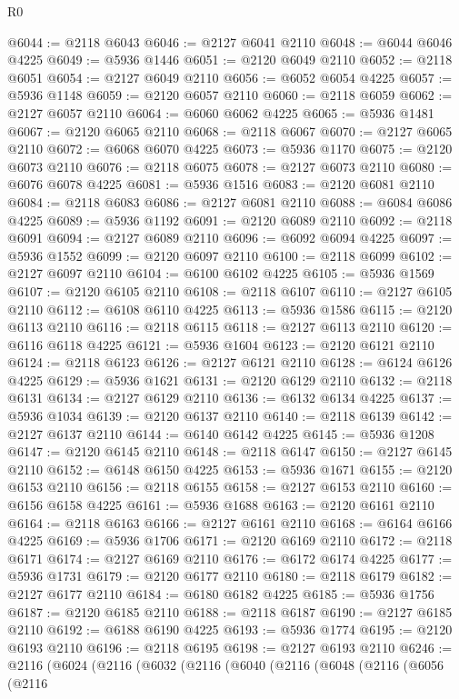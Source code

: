 \begin{lexlean}{R0}
\begin{coremodule}
@6044 := @2118 @6043
@6046 := @2127 @6041 @2110
@6048 := @6044 @6046 @4225
@6049 := @5936 @1446
@6051 := @2120 @6049 @2110
@6052 := @2118 @6051
@6054 := @2127 @6049 @2110
@6056 := @6052 @6054 @4225
@6057 := @5936 @1148
@6059 := @2120 @6057 @2110
@6060 := @2118 @6059
@6062 := @2127 @6057 @2110
@6064 := @6060 @6062 @4225
@6065 := @5936 @1481
@6067 := @2120 @6065 @2110
@6068 := @2118 @6067
@6070 := @2127 @6065 @2110
@6072 := @6068 @6070 @4225
@6073 := @5936 @1170
@6075 := @2120 @6073 @2110
@6076 := @2118 @6075
@6078 := @2127 @6073 @2110
@6080 := @6076 @6078 @4225
@6081 := @5936 @1516
@6083 := @2120 @6081 @2110
@6084 := @2118 @6083
@6086 := @2127 @6081 @2110
@6088 := @6084 @6086 @4225
@6089 := @5936 @1192
@6091 := @2120 @6089 @2110
@6092 := @2118 @6091
@6094 := @2127 @6089 @2110
@6096 := @6092 @6094 @4225
@6097 := @5936 @1552
@6099 := @2120 @6097 @2110
@6100 := @2118 @6099
@6102 := @2127 @6097 @2110
@6104 := @6100 @6102 @4225
@6105 := @5936 @1569
@6107 := @2120 @6105 @2110
@6108 := @2118 @6107
@6110 := @2127 @6105 @2110
@6112 := @6108 @6110 @4225
@6113 := @5936 @1586
@6115 := @2120 @6113 @2110
@6116 := @2118 @6115
@6118 := @2127 @6113 @2110
@6120 := @6116 @6118 @4225
@6121 := @5936 @1604
@6123 := @2120 @6121 @2110
@6124 := @2118 @6123
@6126 := @2127 @6121 @2110
@6128 := @6124 @6126 @4225
@6129 := @5936 @1621
@6131 := @2120 @6129 @2110
@6132 := @2118 @6131
@6134 := @2127 @6129 @2110
@6136 := @6132 @6134 @4225
@6137 := @5936 @1034
@6139 := @2120 @6137 @2110
@6140 := @2118 @6139
@6142 := @2127 @6137 @2110
@6144 := @6140 @6142 @4225
@6145 := @5936 @1208
@6147 := @2120 @6145 @2110
@6148 := @2118 @6147
@6150 := @2127 @6145 @2110
@6152 := @6148 @6150 @4225
@6153 := @5936 @1671
@6155 := @2120 @6153 @2110
@6156 := @2118 @6155
@6158 := @2127 @6153 @2110
@6160 := @6156 @6158 @4225
@6161 := @5936 @1688
@6163 := @2120 @6161 @2110
@6164 := @2118 @6163
@6166 := @2127 @6161 @2110
@6168 := @6164 @6166 @4225
@6169 := @5936 @1706
@6171 := @2120 @6169 @2110
@6172 := @2118 @6171
@6174 := @2127 @6169 @2110
@6176 := @6172 @6174 @4225
@6177 := @5936 @1731
@6179 := @2120 @6177 @2110
@6180 := @2118 @6179
@6182 := @2127 @6177 @2110
@6184 := @6180 @6182 @4225
@6185 := @5936 @1756
@6187 := @2120 @6185 @2110
@6188 := @2118 @6187
@6190 := @2127 @6185 @2110
@6192 := @6188 @6190 @4225
@6193 := @5936 @1774
@6195 := @2120 @6193 @2110
@6196 := @2118 @6195
@6198 := @2127 @6193 @2110
@6246 := @2116
    (@6024
      (@2116
        (@6032
          (@2116
            (@6040
              (@2116
                (@6048
                  (@2116
                    (@6056
                      (@2116

\end{coremodule}
\end{lexlean}
